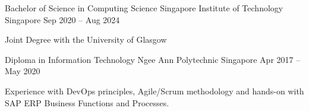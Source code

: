 

\begin{cventries}

  \cventry
  {Bachelor of Science in Computing Science} %
  {Singapore Institute of Technology} %
  {Singapore} %
  {Sep 2020 – Aug 2024} %
  {
    \begin{cvitems} %
      \item {Joint Degree with the University of Glasgow}
      \vspace{4mm}
    \end{cvitems}
  }

  \cventry
  {Diploma in Information Technology} %
  {Ngee Ann Polytechnic} %
  {Singapore} %
  {Apr 2017 – May 2020} %
  {
    \begin{cvitems} %
      \item {Experience with DevOps principles, Agile/Scrum methodology and hands-on with SAP ERP Business Functions and Processes. }
      \vspace{4mm}
    \end{cvitems}
  }

\end{cventries}